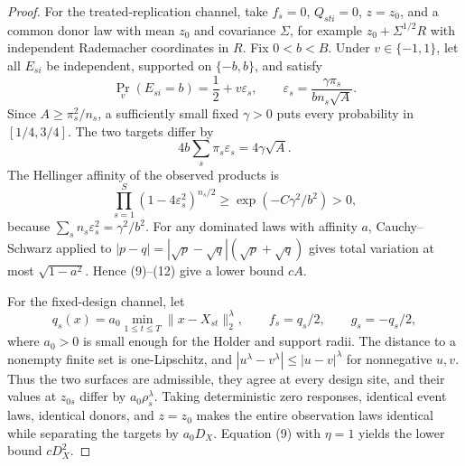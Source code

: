 \documentclass{article}
\begin{document}
\begin{proof}
For the treated-replication channel, take \(f_s=0\), \(Q_{sti}=0\), \(z=z_0\), and a common donor law with mean \(z_0\) and covariance \(\Sigma\), for example \(z_0+\Sigma^{1/2}R\) with independent Rademacher coordinates in \(R\).  Fix \(0<b<B\).  Under \(v\in\{-1,1\}\), let all \(E_{si}\) be independent, supported on \(\{-b,b\}\), and satisfy
\[
 \Pr_v(E_{si}=b)=\frac12+v\varepsilon_s,
 \qquad
 \varepsilon_s=\frac{\gamma\pi_s}{bn_s\sqrt A}.            \tag{10}
\]
Since \(A\ge\pi_s^2/n_s\), a sufficiently small fixed \(\gamma>0\) puts every probability in \([1/4,3/4]\).  The two targets differ by
\[
 4b\sum_s\pi_s\varepsilon_s=4\gamma\sqrt A.                \tag{11}
\]
The Hellinger affinity of the observed products is
\[
 \prod_{s=1}^{S}(1-4\varepsilon_s^2)^{n_s/2}
 \ge \exp(-C\gamma^2/b^2)>0,                                \tag{12}
\]
because \(\sum_sn_s\varepsilon_s^2=\gamma^2/b^2\).  For any dominated laws with affinity \(a\), Cauchy--Schwarz applied to
\(|p-q|=|\sqrt p-\sqrt q|(\sqrt p+\sqrt q)\) gives total variation at most \(\sqrt{1-a^2}\).  Hence (9)--(12) give a lower bound \(cA\).

For the fixed-design channel, let
\[
 q_s(x)=a_0\min_{1\le t\le T}\|x-X_{st}\|_2^\lambda,
 \qquad f_s=q_s/2,
 \qquad g_s=-q_s/2,                                         \tag{13}
\]
where \(a_0>0\) is small enough for the Holder and support radii.  The distance to a nonempty finite set is one-Lipschitz, and
\(|u^\lambda-v^\lambda|\le|u-v|^\lambda\) for nonnegative \(u,v\).  Thus the two surfaces are admissible, they agree at every design site, and their values at \(z_{0s}\) differ by \(a_0\rho_s^\lambda\).  Taking deterministic zero responses, identical event laws, identical donors, and \(z=z_0\) makes the entire observation laws identical while separating the targets by \(a_0D_X\).  Equation (9) with \(\eta=1\) yields the lower bound \(cD_X^2\).


\end{proof}
\end{document}
